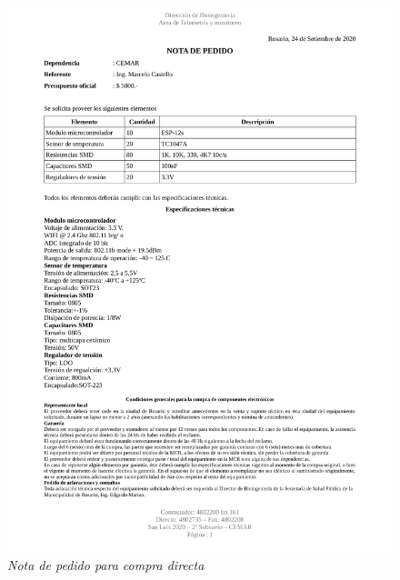 \documentclass[11pt]{charter}
\begin{document}
\begin{figure}[htpb]
\centering 
\includegraphics[width=1\textwidth]{./Figuras/nota_pedido.pdf}
\caption{\textit{Nota de pedido para compra directa}}
\label{nota_pedido}
\end{figure}
\end{document}
